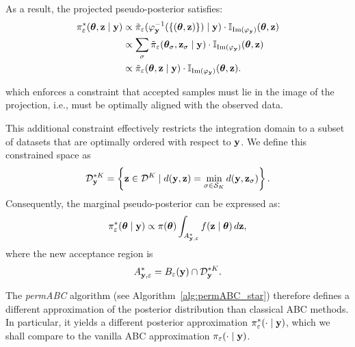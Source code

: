 As a result, the projected pseudo-posterior satisfies:
\begin{equation*}
    \begin{split}
        \pi_{\varepsilon}^* (\boldsymbol{\theta}, \mathbf{z} \mid \mathbf{y}) &  \propto \Tilde \pi_{\varepsilon} (\varphi_{\mathbf{y}}^{-1}(\{(\boldsymbol{\theta}, \mathbf{z})\}) \mid \mathbf{y})\cdot \mathbb I_{\text{Im}(\varphi_{\mathbf{y}})}(\boldsymbol{\theta},\mathbf{z})\\
        & \propto \sum_{\sigma} \Tilde \pi_{\varepsilon} (\boldsymbol{\theta}_{\sigma}, \mathbf{z}_{\sigma} \mid \mathbf{y})\cdot \mathbb I_{\text{Im}(\varphi_{\mathbf{y}})}(\boldsymbol{\theta},\mathbf{z})\\
        & \propto \tilde \pi_{\varepsilon}(\boldsymbol{\theta}, \mathbf{z}\mid \mathbf{y}) \cdot \mathbb I_{\text{Im}(\varphi_{\mathbf{y}})}(\boldsymbol{\theta},\mathbf{z}).
    \end{split}
\end{equation*}


\noindent which enforces a constraint that accepted samples must lie in the image of the projection, i.e., must be optimally aligned with the observed data.

This additional constraint effectively restricts the integration domain to a subset of datasets that are optimally ordered with respect to \( \mathbf{y} \). We define this constrained space as
\[
\mathcal{D}_{\mathbf{y}}^{*K} = \left\{ \mathbf{z} \in \mathcal{D}^K \mid d(\mathbf{y}, \mathbf{z}) = \min_{\sigma \in \mathcal{S}_K} d(\mathbf{y}, \mathbf{z}_{\sigma}) \right\}.
\]
Consequently, the marginal pseudo-posterior can be expressed as:
\begin{equation}
\label{eqpermabc_star}
\pi_{\varepsilon}^*(\boldsymbol{\theta} \mid \mathbf{y}) \propto \pi(\boldsymbol{\theta}) \int_{A_{\mathbf{y},\varepsilon}^*} f(\mathbf{z} \mid \boldsymbol{\theta}) \, d\mathbf{z},
\end{equation}
where the new acceptance region is 
\[
A_{\mathbf{y},\varepsilon}^* = B_{\varepsilon}(\mathbf{y}) \cap \mathcal{D}_{\mathbf{y}}^{*K}.
\]

The \emph{permABC} algorithm (see Algorithm~\ref{alg:permABC_star}) therefore defines a different approximation of the posterior distribution than classical ABC methods. In particular, it yields a different posterior approximation  \( \pi_{\varepsilon}^*(\cdot \mid \mathbf{y}) \), which we shall compare to the vanilla ABC approximation \( \pi_{\varepsilon}(\cdot \mid \mathbf{y}) \).


